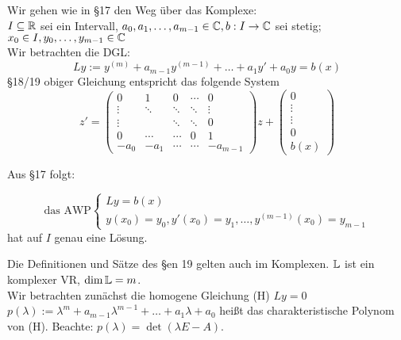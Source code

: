 \documentclass[a4paper,twoside,DIV15,BCOR12mm]{scrbook}
\begin{document}
Wir gehen wie in §17 den Weg über das Komplexe: \\
$I \subseteq \mathbb{R}$ sei ein Intervall, $a_0, a_1, \ldots, a_{m-1} \in \mathbb{C}, b: I \rightarrow \mathbb{C}$ sei stetig;$ x_0 \in I, y_0, \ldots, y_{m-1} \in \mathbb{C}$ \\
Wir betrachten die DGL:
$$Ly := y^{(m)} + a_{m-1}y^{(m-1)} + \ldots + a_1y' + a_0y = b(x)$$
§18/19 obiger Gleichung entspricht das folgende System
$$z' = \begin{pmatrix}
0 	& 1 	 & 0 	  & \cdots & 0 \\ 
\vdots 	& \ddots & \ddots & \ddots & \vdots \\
\vdots 	& 	 & \ddots & \ddots & 0 \\
0	& \cdots & \cdots & 0	   & 1 \\
-a_0	& -a_1	 & \cdots & \cdots & -a_{m-1} \end{pmatrix}z + \begin{pmatrix}0 \\ \vdots \\ \vdots \\ 0 \\ b(x) \end{pmatrix}$$

Aus §17 folgt:

\begin{satz} %
\begin{liste}
\item $$\text{das AWP} \begin{cases} Ly = b(x) \\ y(x_0) = y_0, y'(x_0) = y_1, \ldots, y^{(m-1)}(x_0) = y_{m-1}\end{cases}$$ hat auf $I$ genau eine Lösung.
\item Die Definitionen und Sätze des §en 19 gelten auch im Komplexen. $\mathbb{L}$ ist ein komplexer VR, $\dim\mathbb{L} = m$. \\
Wir betrachten zunächst die homogene Gleichung (H) $Ly=0$ \\
$p(\lambda) := \lambda ^m + a_{m-1}\lambda ^{m-1} + \ldots + a_1\lambda + a_0$ heißt das charakteristische Polynom von (H). Beachte: $p(\lambda) = \det (\lambda E - A)$.
\end{liste}
\end{satz}
\end{document}
